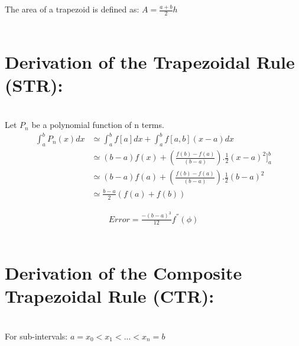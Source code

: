 \documentclass[11pt]{article}
\begin{document}
\begin{page}
\noindent The area of a trapezoid is defined as: $A = \frac{a+b}{2}h$\\
\\

\break

\noindent \chapter{Derivation of the Trapezoidal Rule (STR):}\\
\noindent Let $P_n$ be a polynomial function of n terms.\\

\begin{equation}
\begin{aligned}
    \int_{a}^{b} P_n(x) dx &\simeq{} \int_{a}^{b} f[a]dx + \int_{a}^{b} f[a,b](x-a)dx\\
    &\simeq{} (b-a)f(x) + (\frac{f(b)-f(a)}{(b-a)}).\frac{1}{2}(x-a)^{2}]_{a}^{b}\\
    &\simeq{} (b-a)f(a) + (\frac{f(b)-f(a)}{(b-a)}).\frac{1}{2}(b-a)^{2}\\
    &\simeq{} \frac{b-a}{2}(f(a)+f(b))
\end{aligned}
\end{equation}

\begin{equation}
\begin{aligned}
    Error = \frac{-(b-a)^{3}}{12}f^{''}(\phi)
\end{aligned}
\end{equation} 
\\

\noindent \chapter{Derivation of the Composite Trapezoidal Rule (CTR):}\\
\noindent For sub-intervals: $a = x_0 < x_1 < ... < x_n = b$
\\


\end{page}
\end{document}
